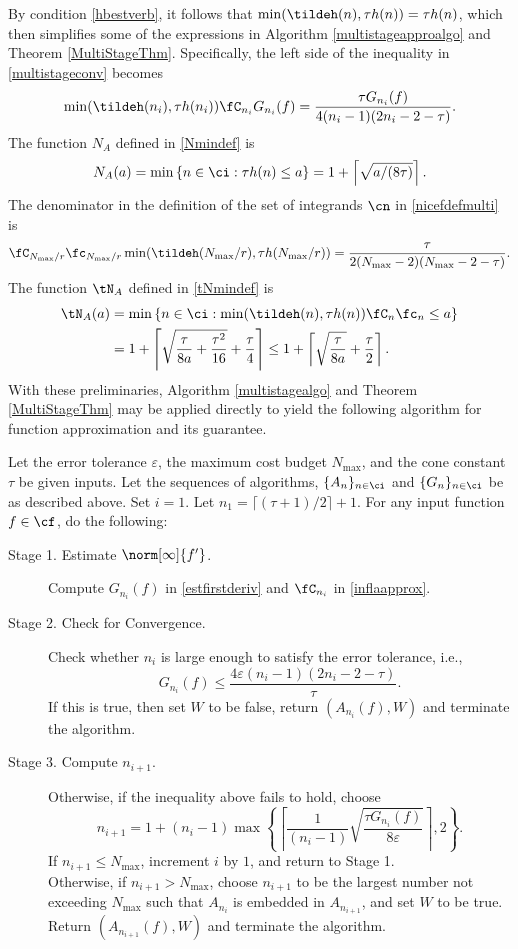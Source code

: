 By condition \eqref{hbestverb}, it follows that $\min(\tildeh(n),\tau h(n))=\tau h(n)$, which then simplifies some of the expressions in Algorithm \ref{multistageapproalgo} and Theorem \ref{MultiStageThm}.  Specifically, the left side of the inequality in \eqref{multistageconv} becomes
\[
\min(\tildeh(n_i),\tau h(n_i))\fC_{n_i} G_{n_i}(f) = \frac{\tau  G_{n_i}(f) } {4(n_i-1)(2n_i-2 -\tau)}.
\]
The function $N_A$ defined in \eqref{Nmindef} is
\[
N_{A}(a)= \min\left\{ n \in \ci : \tau h(n) \le a \right\} = 1+ \left \lceil \sqrt{a/(8\tau)}\right \rceil.
\]
The denominator in the definition of the set of integrands $\cn$ in \eqref{nicefdefmulti} is
\[
\fC_{N_{\max}/r} \fc_{N_{\max}/r} \min(\tildeh(N_{\max}/r),\tau h(N_{\max}/r)) =
\frac{\tau}{2 (N_{\max}-2)(N_{\max}-2 -\tau)}.
\]
The function $\tN_A$ defined in \eqref{tNmindef} is
\begin{align*} \label{tNmindef}
\tN_A(a) &= \min\left\{ n \in \ci : \min(\tildeh(n),\tau h(n))\fC_n\fc_n \le a \right\} \\
&= 1+ \left \lceil \sqrt{\frac{\tau}{8a} + \frac{\tau^2}{16}} +\frac{\tau}{4} \right \rceil \le 1+ \left \lceil\sqrt{\frac{\tau}{8a}} + \frac{\tau}{2} \right \rceil.
\end{align*}
With these preliminaries, Algorithm \ref{multistagealgo} and Theorem \ref{MultiStageThm} may be applied directly to  yield the following algorithm for function approximation and its guarantee.

\begin{algo} \label{multistageapproalgo}
Let the error tolerance $\varepsilon$, the maximum cost budget $N_{\max}$, and the cone constant $\tau$ be given inputs. Let the sequences of algorithms, $\{A_n\}_{n \in \ci}$ and  $\{G_n\}_{n \in \ci}$ be as described above.  Set $i=1$.  Let $n_1=\lceil (\tau+1)/2\rceil + 1$. For any input function $f \in \cf$, do the following:
\begin{description}

\item [Stage 1. Estimate {$\norm[\infty]{f'} $}.]
Compute $G_{n_i}(f)$ in \eqref{estfirstderiv} and $\fC_{n_i}$ in \eqref{inflaapprox}.

\item [Stage 2. Check for Convergence.]
Check whether $n_i$ is large enough to satisfy the error tolerance, i.e.,
$$
G_{n_i}(f) \le \frac{4\varepsilon (n_i-1)(2n_i-2 -\tau)}{\tau} .
$$
If this is true, then set $W$ to be false, return $(A_{n_i}(f),W)$ and terminate the algorithm.


\item[Stage 3. Compute $n_{i+1}$.]  Otherwise, if the inequality above fails to hold,
choose
$$
n_{i+1}=1+ (n_i-1)\max\left\{\left\lceil\frac{1}{(n_i-1)}\sqrt{\frac{\tau G_{n_i}(f)}{8\varepsilon}}\right\rceil,2\right\}.
$$
 If $n_{i+1} \le N_{\max}$, increment $i$ by $1$, and return to Stage 1.\\
Otherwise, if $n_{i+1} > N_{\max}$, choose $n_{i+1}$ to be the largest number not exceeding $N_{\max}$ such that $A_{n_{i}}$ is embedded in $A_{n_{i+1}}$, and set $W$ to be true. Return $(A_{n_{i+1}}(f),W)$ and terminate the algorithm.
\end{description}
\end{algo}

